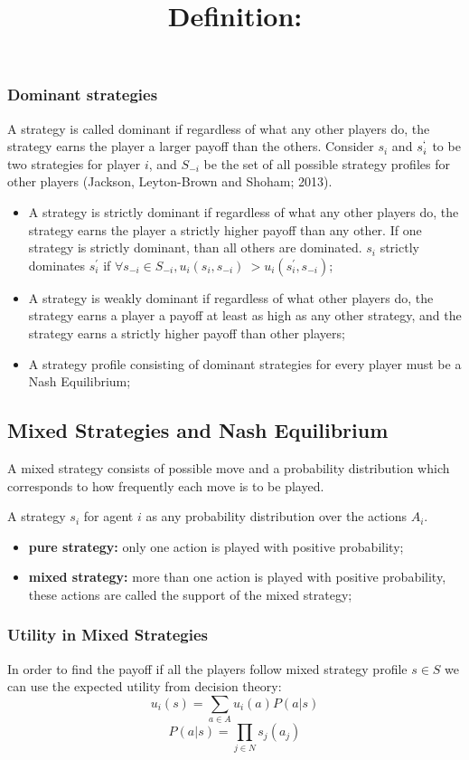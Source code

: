 \subsubsection{Dominant strategies}
A strategy is called dominant if regardless of what any other players do, the strategy earns the player a larger payoff than the others. Consider $s_i$ and $s_i^`$ to be two strategies for player $i$, and $S_{-i}$ be the set of all possible strategy profiles for other players (Jackson, Leyton-Brown and Shoham; 2013).
\begin{itemize}
\item A strategy is strictly dominant if regardless of what any other players do, the strategy earns the player a strictly higher payoff than any other. If one strategy is strictly dominant, than all others are dominated. $s_i$ strictly dominates $s^\prime_{i}$ if $\forall s_{-i} \in S_{-i}, u_i(s_i, s_{-i}) \>> u_i(s^\prime_{i}, s_{-i})$;
\item A strategy is weakly dominant if regardless of what other players do, the strategy earns a player a payoff at least as high as any other strategy, and the strategy earns a strictly higher payoff than other players;
\item A strategy profile consisting of dominant strategies for every player must be a Nash Equilibrium;
\end{itemize}

\subsection{Mixed Strategies and Nash Equilibrium}
A mixed strategy consists of possible move and a probability distribution which corresponds to how frequently each move is to be played.
\title{\textbf{Definition:}}
A strategy $s_i$ for agent $i$ as any probability distribution over the actions $A_i$.
\begin{itemize}
\item \textbf{pure strategy:} only one action is played with positive probability;
\item \textbf{mixed strategy:} more than one action is played with positive probability, these actions are called the support of the mixed strategy;
\end{itemize}

\subsubsection{Utility in Mixed Strategies}
In order to find the payoff if all the players follow mixed strategy profile $s \in S$ we can use the expected utility from decision theory: 
\begin{equation} \label{eq:112}
u_i(s) = \sum_{a \in A}u_i(a)P(a|s)
\end{equation}
\begin{equation} 
P(a|s) = \prod_{j \in N}s_j(a_j)
\end{equation}
